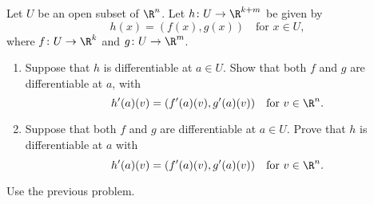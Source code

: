 \documentclass[12pt]{article}
\begin{document}
\begin{problem} \label{prb:vector}
    Let $U$ be an open subset of $\R^n$.
    Let $h\colon U \to \R^{k+m}$ be given by \[
        h(x) = (f(x), g(x)) \quad \text{for } x \in U,
    \] where $f\colon U \to \R^k$ and $g\colon U \to \R^m$.
    \begin{enumerate}
        \item Suppose that $h$ is differentiable at $a \in U$.
        Show that both $f$ and $g$ are differentiable at $a$, with \[
            h'(a)(v) = (f'(a)(v), g'(a)(v)) \quad \text{for } v \in \R^n.
        \]
        \item Suppose that both $f$ and $g$ are differentiable at $a \in U$.
        Prove that $h$ is differentiable at $a$ with \[
            h'(a)(v) = (f'(a)(v), g'(a)(v)) \quad \text{for } v \in \R^n.
        \]
    \end{enumerate}
\end{problem}
\begin{solution}
    Use the previous problem.
\end{solution}
\end{document}
